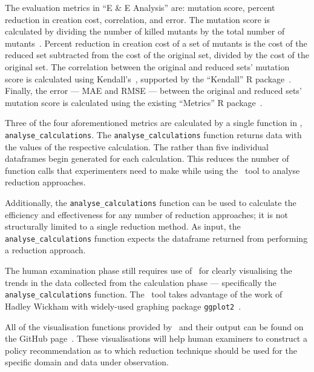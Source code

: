 The evaluation metrics in ``E \& E Analysis'' are: mutation score, percent reduction in creation cost,
correlation, and error. The mutation score is calculated by dividing the number of killed mutants by the total number
of mutants~\cite{}. Percent reduction in creation cost of a set of mutants is the cost of the reduced set subtracted
from the cost of the original set, divided by the cost of the original set. The correlation between the original and reduced sets' mutation score is calculated using Kendall's~\taub, supported
by the ``Kendall'' R package~\cite{mcleod2015kendall}. Finally, the error --- MAE and RMSE --- between the original and reduced sets' mutation score
is calculated using the existing ``Metrics'' R package~\cite{metrics}.

Three of the four aforementioned metrics are calculated by a single function in \mr, \texttt{analyse\_calculations}.
The \texttt{analyse\_calculations} function returns data with the values of the respective calculation.
The rather than five individual dataframes begin generated for
each calculation. This reduces the number of function calls that experimenters
need to make while using the \mr~tool to analyse reduction approaches.

Additionally, the \texttt{analyse\_calculations} function can be used to calculate the
efficiency and effectiveness for any number of reduction approaches; it is not structurally
limited to a single reduction method. As input, the \texttt{analyse\_calculations} function
expects the dataframe returned from performing a reduction approach.

The human examination phase still requires use of \mr~for clearly visualising the trends
in the data collected from the calculation phase --- specifically the \texttt{analyse\_calculations}
function. The \mr~tool takes advantage of the work of Hadley Wickham with widely-used
graphing package \texttt{ggplot2}~\cite{ggplot2}.

All of the visualisation functions provided by \mr~and their output can be found on the GitHub
page~\cite{tool}. These visualisations will help human examiners to construct a policy recommendation
as to which reduction technique should be used for the specific domain and data under observation.
